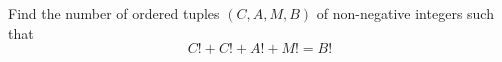 Find the number of ordered tuples $\left(C,A,M,B\right)$ of non-negative integers such that \[C!+C!+A!+M!=B!\]
